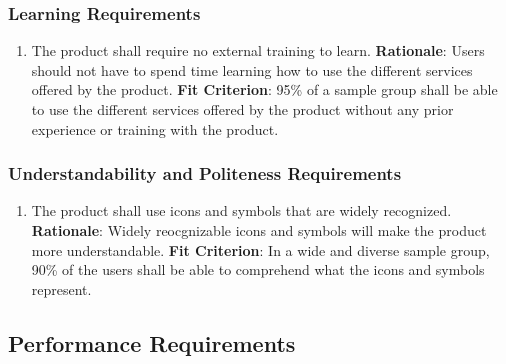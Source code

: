 \documentclass[12pt]{article}
\begin{document}
\subsubsection{Learning Requirements}
\begin{enumerate}[nfr]
    \item The product shall require no external training to learn.
    \newline \textbf{Rationale}: Users should not have to spend time learning how to use the different services offered by the product.
    \newline \textbf{Fit Criterion}: 95\% of a sample group shall be able to use the different services offered by the product without any prior experience or training with the product.
\end{enumerate}

\subsubsection{Understandability and Politeness Requirements}
\begin{enumerate}[nfr]
    \item The product shall use icons and symbols that are widely recognized.
    \newline \textbf{Rationale}: Widely reocgnizable icons and symbols will make the product more understandable.
    \newline \textbf{Fit Criterion}: In a wide and diverse sample group, 90\% of the users shall be able to comprehend what the icons and symbols represent.
\end{enumerate}

\subsection{Performance Requirements}
\end{document}
